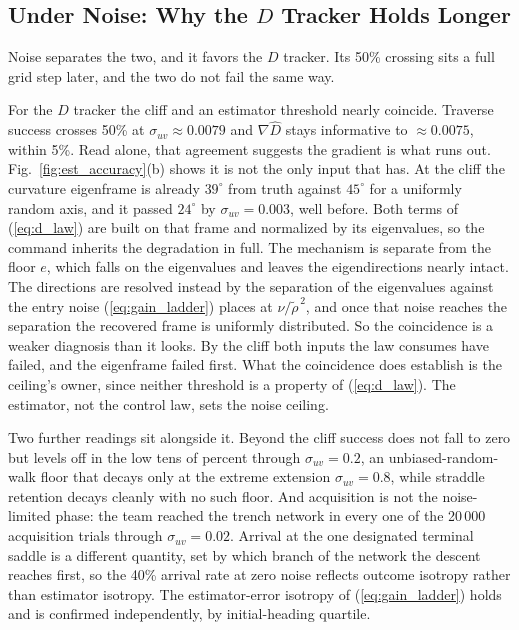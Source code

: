 \documentclass[lettersize,journal]{IEEEtran}
\begin{document}
\subsection{Under Noise: Why the $D$ Tracker Holds Longer}
\label{sec:disc_noise}

Noise separates the two, and it favors the $D$ tracker. Its 50\%
crossing sits a full grid step later, and the two do not fail the same
way.

For the $D$ tracker the cliff and an estimator threshold nearly
coincide. Traverse success crosses 50\% at $\sigma_{uv} \approx 0.0079$
and $\nabla\hat{D}$ stays informative to $\approx 0.0075$, within 5\%.
Read alone, that agreement suggests the gradient is what runs out.
Fig.~\ref{fig:est_accuracy}(b) shows it is not the only input that has.
At the cliff the curvature eigenframe is already $39^\circ$ from truth
against $45^\circ$ for a uniformly random axis, and it passed
$24^\circ$ by $\sigma_{uv} = 0.003$, well before. Both terms of
(\ref{eq:d_law}) are built on that frame and normalized by its
eigenvalues, so the command inherits the degradation in full. The
mechanism is separate from the floor $e$, which falls on the
eigenvalues and leaves the eigendirections nearly intact. The
directions are resolved instead by the separation of the eigenvalues
against the entry noise (\ref{eq:gain_ladder}) places at
$\nu/\tilde{\rho}^{\,2}$, and once that noise reaches the separation
the recovered frame is uniformly distributed. So the coincidence is a
weaker diagnosis than it looks. By the cliff both inputs the law
consumes have failed, and the eigenframe failed first. What the
coincidence does establish is the ceiling's owner, since neither
threshold is a property of (\ref{eq:d_law}). The estimator, not the
control law, sets the noise ceiling.

Two further readings sit alongside it. Beyond the cliff success does
not fall to zero but levels off in the low tens of percent through
$\sigma_{uv} = 0.2$, an unbiased-random-walk floor that decays only at
the extreme extension $\sigma_{uv} = 0.8$, while straddle retention
decays cleanly with no such floor. And acquisition is not the
noise-limited phase: the team reached the trench network in every one
of the 20\,000 acquisition trials through $\sigma_{uv} = 0.02$. Arrival
at the one designated terminal saddle is a different quantity, set by
which branch of the network the descent reaches first, so the 40\%
arrival rate at zero noise reflects outcome isotropy rather than
estimator isotropy. The estimator-error isotropy of
(\ref{eq:gain_ladder}) holds and is confirmed independently, by
initial-heading quartile.
\end{document}

